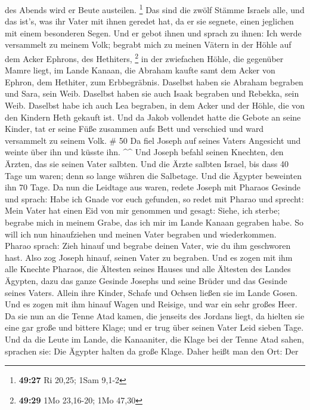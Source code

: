 des Abends wird er Beute austeilen. \footnote{\textbf{49:27} Ri 20,25;
  1Sam 9,1-2}  Das sind die zwölf Stämme Israels alle, und
das ist's, was ihr Vater mit ihnen geredet hat, da er sie segnete, einen
jeglichen mit einem besonderen Segen.  Und er gebot ihnen
und sprach zu ihnen: Ich werde versammelt zu meinem Volk; begrabt mich
zu meinen Vätern in der Höhle auf dem Acker Ephrons, des Hethiters,
\footnote{\textbf{49:29} 1Mo 23,16-20; 1Mo 47,30}  in der
zwiefachen Höhle, die gegenüber Mamre liegt, im Lande Kanaan, die
Abraham kaufte samt dem Acker von Ephron, dem Hethiter, zum
Erbbegräbnis.  Daselbst haben sie Abraham begraben und
Sara, sein Weib. Daselbst haben sie auch Isaak begraben und Rebekka,
sein Weib. Daselbst habe ich auch Lea begraben,  in dem
Acker und der Höhle, die von den Kindern Heth gekauft ist. 
Und da Jakob vollendet hatte die Gebote an seine Kinder, tat er seine
Füße zusammen aufs Bett und verschied und ward versammelt zu seinem
Volk. \# 50  Da fiel Joseph auf seines Vaters Angesicht und
weinte über ihn und küsste ihn. \^{}\^{}  Und Joseph befahl
seinen Knechten, den Ärzten, das sie seinen Vater salbten. Und die Ärzte
salbten Israel,  bis dass 40 Tage um waren; denn so lange
währen die Salbetage. Und die Ägypter beweinten ihn 70 Tage.
 Da nun die Leidtage aus waren, redete Joseph mit Pharaos
Gesinde und sprach: Habe ich Gnade vor euch gefunden, so redet mit
Pharao und sprecht:  Mein Vater hat einen Eid von mir
genommen und gesagt: Siehe, ich sterbe; begrabe mich in meinem Grabe,
das ich mir im Lande Kanaan gegraben habe. So will ich nun hinaufziehen
und meinen Vater begraben und wiederkommen.  Pharao sprach:
Zieh hinauf und begrabe deinen Vater, wie du ihm geschworen hast.
 Also zog Joseph hinauf, seinen Vater zu begraben. Und es
zogen mit ihm alle Knechte Pharaos, die Ältesten seines Hauses und alle
Ältesten des Landes Ägypten,  dazu das ganze Gesinde Josephs
und seine Brüder und das Gesinde seines Vaters. Allein ihre Kinder,
Schafe und Ochsen ließen sie im Lande Gosen.  Und es zogen
mit ihm hinauf Wagen und Reisige, und war ein sehr großes Heer.
 Da sie nun an die Tenne Atad kamen, die jenseits des
Jordans liegt, da hielten sie eine gar große und bittere Klage; und er
trug über seinen Vater Leid sieben Tage.  Und da die Leute
im Lande, die Kanaaniter, die Klage bei der Tenne Atad sahen, sprachen
sie: Die Ägypter halten da große Klage. Daher heißt man den Ort: Der
